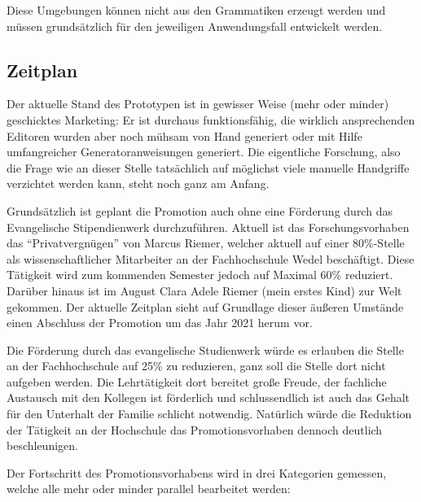 \documentclass[paper=a4,fontsize=12pt,parskip=half]{scrartcl}
\begin{document}
Diese Umgebungen können nicht aus den Grammatiken erzeugt werden und müssen grundsätzlich für den jeweiligen Anwendungsfall entwickelt werden.

\subsection{Zeitplan}

Der aktuelle Stand des Prototypen ist in gewisser Weise (mehr oder minder) geschicktes Marketing: Er ist durchaus funktionsfähig, die wirklich ansprechenden Editoren wurden aber noch mühsam von Hand generiert oder mit Hilfe umfangreicher Generatoranweisungen generiert. Die eigentliche Forschung, also die Frage wie an dieser Stelle tatsächlich auf möglichst viele manuelle Handgriffe verzichtet werden kann, steht noch ganz am Anfang.

Grundsätzlich ist geplant die Promotion auch ohne eine Förderung durch das Evangelische Stipendienwerk durchzuführen. Aktuell ist das Forschungsvorhaben das \enquote{Privatvergnügen} von Marcus Riemer, welcher aktuell auf einer 80\%-Stelle als wissenschaftlicher Mitarbeiter an der Fachhochschule Wedel beschäftigt. Diese Tätigkeit wird zum kommenden Semester jedoch auf Maximal 60\% reduziert. Darüber hinaus ist im August Clara Adele Riemer (mein erstes Kind) zur Welt gekommen. Der aktuelle Zeitplan sieht auf Grundlage dieser äußeren Umstände einen Abschluss der Promotion um das Jahr 2021 herum vor.

Die Förderung durch das evangelische Studienwerk würde es erlauben die Stelle an der Fachhochschule auf 25\% zu reduzieren, ganz soll die Stelle dort nicht aufgeben werden. Die Lehrtätigkeit dort bereitet große Freude, der fachliche Austausch mit den Kollegen ist förderlich und schlussendlich ist auch das Gehalt für den Unterhalt der Familie schlicht notwendig. Natürlich würde die Reduktion der Tätigkeit an der Hochschule das Promotionsvorhaben dennoch deutlich beschleunigen.

Der Fortschritt des Promotionsvorhabens wird in drei Kategorien gemessen, welche alle mehr oder minder parallel bearbeitet werden:
\end{document}
